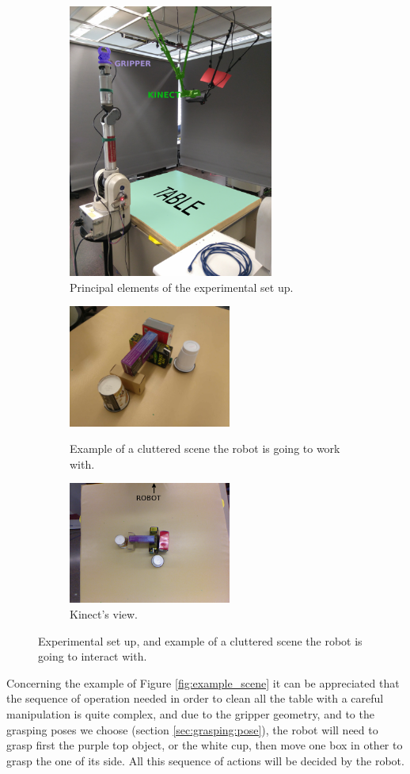 \begin{figure}[htp]
\centering
\begin{subfigure}[b]{0.4\textwidth}
\includegraphics[height=9cm]{Img/set_up/set_up_nice2.png}
\caption{Principal elements of the experimental set up.}\label{fig:setup_}
\end{subfigure}
\qquad \qquad 
\begin{subfigure}[b]{0.4\textwidth}
\centering
\includegraphics[height=4cm]{Img/set_up/example_setup.jpg}
\caption{Example of a cluttered scene the robot is going to work with.}\label{fig:example_scene}
\vspace{2ex}
\includegraphics[height=4cm]{Img/set_up/view_kinect.png}
\caption{Kinect's view.}\label{fig:kinect_view}
\end{subfigure}
\caption{Experimental set up, and example of a cluttered scene the robot is going to interact with.}
\label{fig:setup}
\end{figure}


Concerning the example of Figure \ref{fig:example_scene} it can be appreciated that the sequence of operation needed in order to clean all the table with a careful manipulation is quite complex, and due to the gripper geometry, and to the grasping poses we choose (section \ref{sec:grasping:pose}), the robot will need to grasp first the purple top object, or the white cup, then move one box in other to grasp the one of its side. All this sequence of actions will be decided by the robot.



